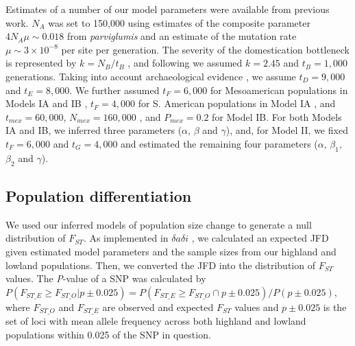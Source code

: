 Estimates of a number of our model parameters were available from previous work.    
$N_A$ was set to 150,000 using estimates of the composite parameter $4N_A\mu \sim 0.018$ from \emph{parviglumis}  \cite[]{Eyre-Walker_1998_9539756,Tenaillon_2001_11470895,Tenaillon_2004_15014173,Wright_2005_15919994,Ross-Ibarra_2009_19153259} and an estimate of the mutation rate $\mu \sim 3\times 10^{-8}$ \cite[]{Clark_2005_16079248} per site per generation.  
The severity of the domestication bottleneck is represented by $k=N_B/t_B$ \cite[]{Eyre-Walker_1998_9539756,Wright_2005_15919994}, and following \cite{Wright_2005_15919994} we assumed $k=2.45$ and $t_B=1,000$ generations.  
Taking into account archaeological evidence \cite[]{Piperno_2009_19307570}, we assume $t_D=9,000$ and $t_E=8,000$.  
We further assumed $t_F=6,000$ for Mesoamerican populations in Models IA and IB \cite[]{Piperno_2006_69}, $t_F=4,000$ for S. American populations in Model IA \cite[]{Perry_2006_16511492,Grobman_2012_22307642}, and $t_{mex}=60,000$, $N_{mex}=160,000$ \cite[]{Ross-Ibarra_2009_19153259}, and $P_{mex}=0.2$ \cite[]{vanHeerwaarden_2011_21189301} for Model IB. 
For both Models IA and IB, we inferred three parameters ($\alpha$, $\beta$ and $\gamma$), and, for Model II, we fixed $t_F=6,000$ and $t_G=4,000$ \cite[]{Piperno_2006_69,Perry_2006_16511492,Grobman_2012_22307642}  and estimated the remaining four parameters ($\alpha$, $\beta_1$, $\beta_2$ and $\gamma$).

\subsection*{Population differentiation}
We used our inferred models of population size change to generate a null distribution of $F_{ST}$.
As implemented in $\delta a \delta i$ \cite[]{Gutenkunst_2009_19851460}, we calculated an expected JFD given estimated model parameters and the sample sizes from our highland and lowland populations.
Then, we converted the JFD into the distribution of $F_{ST}$ values.
The \emph{P}-value of a SNP was calculated by $P(F_{ST\_E}\geq F_{ST\_O}|p\pm 0.025) = P(F_{ST\_E}\geq F_{ST\_O} \cap p\pm 0.025)/P(p\pm 0.025)$, 
where $F_{ST\_O}$ and $F_{ST\_E}$ are observed and expected $F_{ST}$ values and $p\pm 0.025$ is the set of loci with mean allele frequency across both highland and lowland populations within 0.025 of the SNP in question. 

